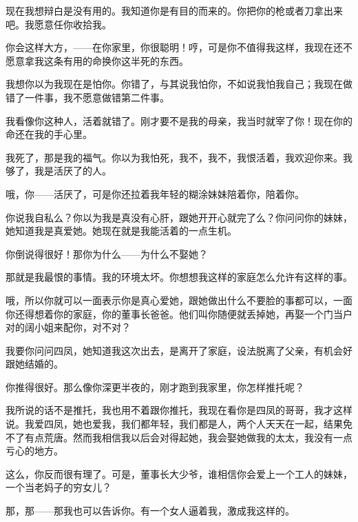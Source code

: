 现在我想辩白是没有用的。我知道你是有目的而来的。你把你的枪或者刀拿出来吧。我愿意任你收拾我。

你会这样大方，——在你家里，你很聪明！哼，可是你不值得我这样，我现在还不愿意拿我这条有用的命换你这半死的东西。

我想你以为我现在是怕你。你错了，与其说我怕你，不如说我怕我自己；我现在做错了一件事，我不愿意做错第二件事。

我看像你这种人，活着就错了。刚才要不是我的母亲，我当时就宰了你！现在你的命还在我的手心里。

我死了，那是我的福气。你以为我怕死，我不，我不，我恨活着，我欢迎你来。我够了，我是活厌了的人。

哦，你——活厌了，可是你还拉着我年轻的糊涂妹妹陪着你，陪着你。

你说我自私么？你以为我是真没有心肝，跟她开开心就完了么？你问问你的妹妹，她知道我是真爱她。她现在就是我能活着的一点生机。

你倒说得很好！那你为什么——为什么不娶她？

那就是我最恨的事情。我的环境太坏。你想想我这样的家庭怎么允许有这样的事。

哦，所以你就可以一面表示你是真心爱她，跟她做出什么不要脸的事都可以，一面你还得想着你的家庭，你的董事长爸爸。他们叫你随便就丢掉她，再娶一个门当户对的阔小姐来配你，对不对？

我要你问问四凤，她知道我这次出去，是离开了家庭，设法脱离了父亲，有机会好跟她结婚的。

你推得很好。那么像你深更半夜的，刚才跑到我家里，你怎样推托呢？

我所说的话不是推托，我也用不着跟你推托，我现在看你是四凤的哥哥，我才这样说。我爱四凤，她也爱我，我们都年轻，我们都是人，两个人天天在一起，结果免不了有点荒唐。然而我相信我以后会对得起她，我会娶她做我的太太，我没有一点亏心的地方。

这么，你反而很有理了。可是，董事长大少爷，谁相信你会爱上一个工人的妹妹，一个当老妈子的穷女儿？

那，那——那我也可以告诉你。有一个女人逼着我，激成我这样的。

